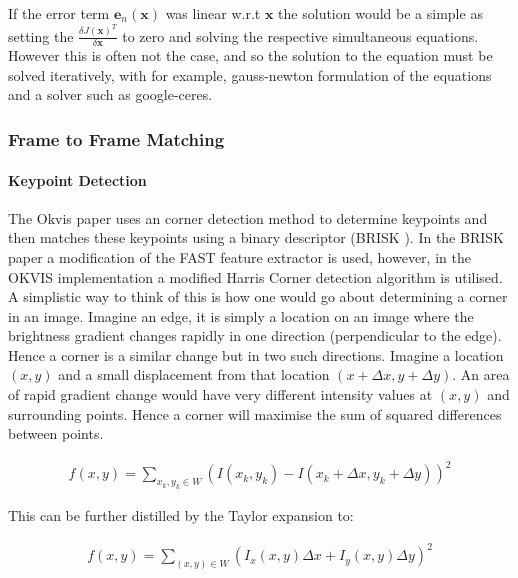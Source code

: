 \documentclass[11pt,twoside]{report}
\begin{document}
If the error term $\mathbf{e}_{n}(\mathbf{x})$ was linear w.r.t $\mathbf{x}$ the solution would be a simple as setting the $\frac{\delta J(\mathbf{x})^{T}}{\delta \mathbf{x}}$ to zero and solving the respective simultaneous equations. However this is often not the case, and so the solution to the equation must be solved iteratively, with for example, gauss-newton formulation of the equations and a solver such as google-ceres.

\subsubsection{Frame to Frame Matching}\label{BRISK_section}

\paragraph{Keypoint Detection}

The Okvis \cite{Okvis_1} paper uses an corner detection method to determine keypoints and then matches these keypoints using a binary descriptor (BRISK \cite{BRISK}). In the BRISK paper a modification of the FAST feature extractor is used, however, in the OKVIS implementation a modified Harris Corner detection algorithm is utilised. A simplistic way to think of this is how one would go about determining a corner in an image. Imagine an edge, it is simply a location on an image where the brightness gradient changes rapidly in one direction (perpendicular to the edge). Hence a corner is a similar change but in two such directions. Imagine a location $(x,y)$ and a small displacement from that location $(x+ \Delta x, y + \Delta y)$. An area of rapid gradient change would have very different intensity values at $(x,y)$ and surrounding points. Hence a corner will maximise the sum of squared differences between points.

\begin{equation}
\begin{aligned}
f(x,y) = \sum_{x_{k},y_{k} \in W} (I(x_{k},y_{k}) - I(x_{k} + \Delta x,y_{k} + \Delta y))^{2}
\end{aligned}
\end{equation}

This can be further distilled by the Taylor expansion to:

\begin{equation}
\begin{aligned}
f(x,y) = \sum_{(x,y)\in W} (I_{x}(x,y) \Delta x + I_{y}(x,y) \Delta y )^{2}
\end{aligned}
\end{equation}
\end{document}

